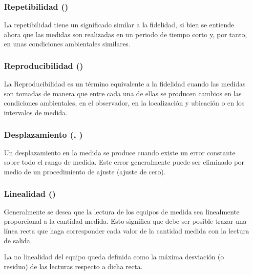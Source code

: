 \subsubsection{Repetibilidad ()}

La repetibilidad tiene un significado similar a la fidelidad, si bien se entiende ahora que las medidas son realizadas en un periodo de tiempo corto y, por tanto, en unas condiciones ambientales similares.

\subsubsection{Reproducibilidad ()}

La Reproducibilidad es un término equivalente a la fidelidad cuando las medidas son tomadas de manera que entre cada una de ellas se producen cambios en las condiciones ambientales, en el observador, en la localización y ubicación o en los intervalos de medida.

\subsubsection{Desplazamiento (, )}

Un desplazamiento en la medida se produce cuando existe un error constante sobre todo el rango de medida. Este error generalmente puede ser eliminado por medio de un procedimiento de ajuste (ajuste de cero).

\subsubsection{Linealidad ()}

Generalmente se desea que la lectura de los equipos de medida sea linealmente proporcional a la cantidad medida. Esto significa que debe ser posible trazar una línea recta que haga corresponder cada valor de la cantidad medida con la lectura de salida. 

La no linealidad del equipo queda definida como la máxima desviación (o residuo) de las lecturas respecto a dicha recta.

